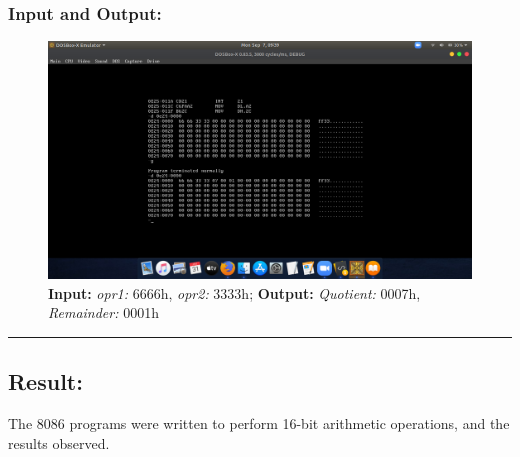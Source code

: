 \documentclass[12pt,a4paper]{article}
\begin{document}
\begin{flushleft}
\subsubsection*{\textbf{Input and Output:}}
\begin{figure}[h]
    \centering
    \includegraphics[trim = 100mm 75mm 100mm 70mm, clip, width = \textwidth]{Pics/DivisionIO.png}
    \caption{ \textbf{Input:} \emph{opr1:} 6666h, \emph{opr2:} 3333h; 
              \textbf{Output:} \emph{Quotient:} 0007h, \emph{Remainder:} 0001h}
\end{figure}

\hrule
\subsection*{\textbf{Result:}}
The 8086 programs were written to perform 16-bit arithmetic operations, and the results observed.
\end{flushleft}
\end{document}
